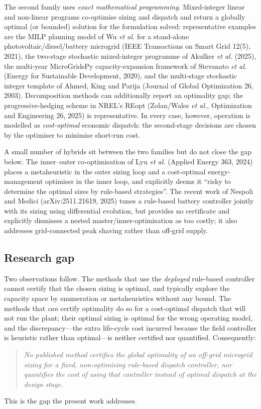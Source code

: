 \documentclass[11pt,a4paper]{article}
\theoremstyle{plain}
\theoremstyle{definition}
\begin{document}
The second family uses \emph{exact mathematical programming}. Mixed-integer linear and
non-linear programs co-optimise sizing and dispatch and return a globally optimal (or
bounded) solution for the formulation solved: representative examples are the MILP
planning model of Wu \emph{et al.} for a stand-alone photovoltaic/diesel/battery microgrid
(IEEE Transactions on Smart Grid 12(5), 2021), the two-stage stochastic mixed-integer
programme of Akulker \emph{et al.} (2025), the multi-year MicroGridsPy capacity-expansion
framework of Stevanato \emph{et al.} (Energy for Sustainable Development, 2020), and the
multi-stage stochastic integer template of Ahmed, King and Parija (Journal of Global
Optimization 26, 2003). Decomposition methods can additionally report an optimality gap;
the progressive-hedging scheme in NREL's REopt (Zolan/Wales \emph{et al.}, Optimization
and Engineering 26, 2025) is representative. In every case, however, operation is modelled
as \emph{cost-optimal} economic dispatch: the second-stage decisions are chosen by the
optimiser to minimise short-run cost.

A small number of hybrids sit between the two families but do not close the gap below.
The inner--outer co-optimisation of Lyu \emph{et al.} (Applied Energy 363, 2024) places a
metaheuristic in the outer sizing loop and a cost-optimal energy-management optimiser in
the inner loop, and explicitly deems it ``risky to determine the optimal sizes by
rule-based strategies''. The recent work of Nespoli and Medici (arXiv:2511.21619, 2025)
tunes a rule-based battery controller jointly with its sizing using differential
evolution, but provides no certificate and explicitly dismisses a nested
master/inner-optimisation as too costly; it also addresses grid-connected peak shaving
rather than off-grid supply.

\subsection{Research gap}
\label{sec:gap}

Two observations follow. The methods that use the \emph{deployed} rule-based controller
cannot certify that the chosen sizing is optimal, and typically explore the capacity space
by enumeration or metaheuristics without any bound. The methods that \emph{can} certify
optimality do so for a cost-optimal dispatch that will not run the plant; their optimal
sizing is optimal for the wrong operating model, and the discrepancy---the extra
life-cycle cost incurred because the field controller is heuristic rather than
optimal---is neither certified nor quantified. Consequently:
\begin{quote}
\emph{No published method certifies the global optimality of an off-grid microgrid sizing
for a fixed, non-optimising rule-based dispatch controller, nor quantifies the cost of
using that controller instead of optimal dispatch at the design stage.}
\end{quote}
This is the gap the present work addresses.
\end{document}
